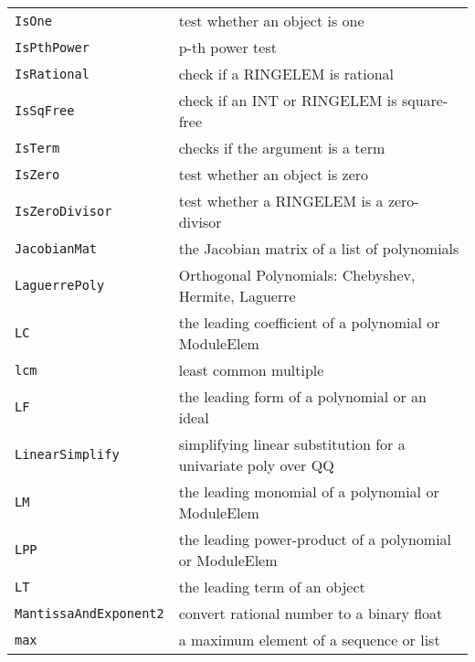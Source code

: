 \documentclass[a4paper]{mybook}
\begin{document}
\begin{center}
\begin{longtable}{ll}
{\verb~IsOne~} &
      test whether an object is one\\
   
{\verb~IsPthPower~} &
      p-th power test\\
   
{\verb~IsRational~} &
      check if a RINGELEM is rational\\
   
{\verb~IsSqFree~} &
      check if an INT or RINGELEM is square-free\\
   
{\verb~IsTerm~} &
      checks if the argument is a term\\
   
{\verb~IsZero~} &
      test whether an object is zero\\
   
{\verb~IsZeroDivisor~} &
      test whether a RINGELEM is a zero-divisor\\
   
{\verb~JacobianMat~} &
      the Jacobian matrix of a list of polynomials\\
   
{\verb~LaguerrePoly~} &
      Orthogonal Polynomials: Chebyshev, Hermite, Laguerre\\
   
{\verb~LC~} &
      the leading coefficient of a polynomial or ModuleElem\\
   
{\verb~lcm~} &
      least common multiple\\
   
{\verb~LF~} &
      the leading form of a polynomial or an ideal\\
   
{\verb~LinearSimplify~} &
      simplifying linear substitution for a univariate poly over QQ\\
   
{\verb~LM~} &
      the leading monomial of a polynomial or ModuleElem\\
   
{\verb~LPP~} &
      the leading power-product of a polynomial or ModuleElem\\
   
{\verb~LT~} &
      the leading term of an object\\
   
{\verb~MantissaAndExponent2~} &
      convert rational number to a binary float\\
   
{\verb~max~} &
      a maximum element of a sequence or list\\
   

\end{longtable}
\end{center}
\end{document}
